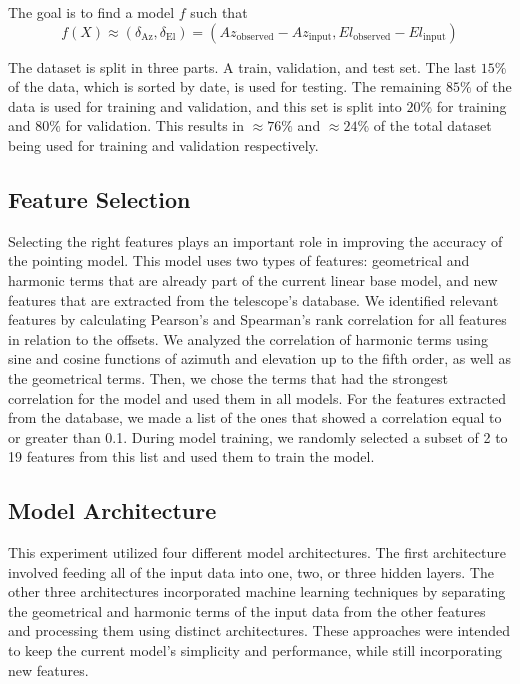 The goal is to find a model $f$ such that
\begin{equation}
    f(X) \approx (\delta_{\text{Az}}, \delta_{\text{El}}) = (Az_{\text{observed}}-Az_{\text{input}}, El_{\text{observed}}-El_{\text{input}})
\end{equation}

The dataset is split in three parts. A train, validation, and test set.
The last $15\%$ of the data, which is sorted by date, is used for testing.
The remaining $85\%$ of the data is used for training and validation, and this set is split into $20\%$ for training and $80\%$ for validation.
This results in $\approx 76\%$ and $\approx 24\%$ of the total dataset being used for training and validation respectively.


\subsection{Feature Selection}
Selecting the right features plays an important role in improving the accuracy of the pointing model.
This model uses two types of features: geometrical and harmonic terms that are already part of the current linear base model, and new features that are extracted from the telescope's database.
We identified relevant features by calculating Pearson's and Spearman's rank correlation for all features in relation to the offsets.
We analyzed the correlation of harmonic terms using sine and cosine functions of azimuth and elevation up to the fifth order, as well as the geometrical terms.
Then, we chose the terms that had the strongest correlation for the model and used them in all models.
For the features extracted from the database, we made a list of the ones that showed a correlation equal to or greater than 0.1.
During model training, we randomly selected a subset of 2 to 19 features from this list and used them to train the model.

\subsection{Model Architecture}
This experiment utilized four different model architectures.
The first architecture involved feeding all of the input data into one, two, or three hidden layers.
The other three architectures incorporated machine learning techniques by separating the geometrical and harmonic terms of the input data from the other features and processing them using distinct architectures.
These approaches were intended to keep the current model's simplicity and performance, while still incorporating new features.

